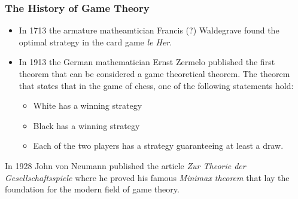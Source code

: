 \documentclass{beamer}
\begin{document}
\begin{frame}
  
\frametitle{The History of Game Theory}

\begin{itemize}
\item In 1713 the armature matheamtician Francis (?) Waldegrave found the optimal strategy in the card game \emph{le Her}.
  \item In 1913 the German mathematician Ernst Zermelo  published
the first theorem that can be considered a game theoretical
theorem. The theorem that states that in the game of chess, one of the following statements hold:
\begin{itemize}
\item White has a winning strategy
\item Black has a winning strategy
  \item Each of the two players has a strategy guaranteeing at least a
    draw.
  \end{itemize}
\end{itemize}

In 1928 John von Neumann published the article \emph{Zur
      Theorie der Gesellschaftsspiele} where he proved his famous
    \emph{Minimax theorem} that lay the foundation for the modern
    field of game theory. 
\end{frame}
\end{document}
